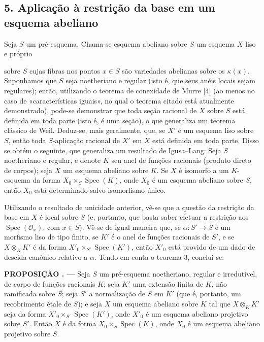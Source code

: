 \documentclass[11pt,twoside,openany]{book}
\numberwithin{equation}{section}
\newcommand{\src}[1]{%
  \phantomsection\hypertarget{src:#1}{}%
  \marginpar{\raggedleft\footnotesize\sffamily #1}%
}
\theoremstyle{plain}
\theoremstyle{definition}
\theoremstyle{remark}
\newcommand{\result}[2]{%
  \par\medskip\noindent\textbf{#1%
  \if\relax\detokenize{#2}\relax\else\space#2\fi. ---}\enspace
}
\newcommand{\FgaUnitKey}{frontmatter}
\renewcommand{\src}[1]{%
  \phantomsection\hypertarget{src:\FgaUnitKey:#1}{}%
  \marginpar{\raggedleft\footnotesize\sffamily #1}%
}
\begin{document}
\subsection*{5. Aplicação à restrição da base em um esquema abeliano}

Seja $S$ um pré-esquema. Chama-se esquema abeliano sobre $S$ um esquema $X$
liso e próprio

\src{324}
sobre $S$ cujas fibras nos pontos $x\in S$ são variedades abelianas sobre os
$\kappa(x)$. Suponhamos que $S$ seja noetheriano e regular
(isto é, que seus anéis locais sejam regulares); então, utilizando o
teorema de conexidade de Murre [4] (ao menos no caso de «características
iguais», no qual o teorema citado está atualmente demonstrado), pode-se
demonstrar que toda seção racional de $X$ sobre $S$ está definida em toda
parte (isto é, é uma seção), o que generaliza um teorema clássico de
Weil. Deduz-se, mais geralmente, que, se $X'$ é um esquema liso sobre $S$,
então toda $S$-aplicação racional de $X'$ em $X$ está definida em toda
parte. Disso se obtém o seguinte, que generaliza um resultado de
Igusa--Lang: Seja $S$ noetheriano e regular, e denote $K$ seu
anel de funções racionais (produto direto de corpos); seja $X$ um
esquema abeliano sobre $K$. Se $X$ é isomorfo a um $K$-esquema da forma
$X_0\times_S\operatorname{Spec}(K)$, onde $X_0$ é um esquema abeliano sobre
$S$, então $X_0$ está determinado salvo isomorfismo único.

Utilizando o resultado de unicidade anterior, vê-se que a questão da
restrição da base em $X$ é local sobre $S$ (e, portanto, que basta saber
efetuar a restrição aos $\operatorname{Spec}(\mathcal O_x)$, com
$x\in S$). Vê-se de igual maneira que, se
$\alpha:S'\longrightarrow S$ é um morfismo liso de tipo finito, se $K'$ é o
anel de funções racionais de $S'$, e se $X\otimes_KK'$ é da forma
$X'_0\times_{S'}\operatorname{Spec}(K')$, então $X'_0$ está provido de um
dado de descida canônico relativo a $\alpha$. Tendo em conta o teorema 3,
conclui-se:

\result{PROPOSIÇÃO}{5.1} Seja $S$ um pré-esquema noetheriano, regular e
irredutível, de corpo de funções racionais $K$; seja $K'$ uma extensão
finita de $K$, não ramificada sobre $S$; seja $S'$ a normalização de $S$ em
$K'$ (que é, portanto, um recobrimento étale de $S$); e seja $X$ um esquema
abeliano sobre $K$ tal que $X\otimes_KK'$ seja da forma
$X'_0\times_{S'}\operatorname{Spec}(K')$, onde $X'_0$ é um esquema abeliano
projetivo sobre $S'$. Então $X$ é da forma
$X_0\times_S\operatorname{Spec}(K)$, onde $X_0$ é um esquema abeliano
projetivo sobre $S$.
\end{document}
